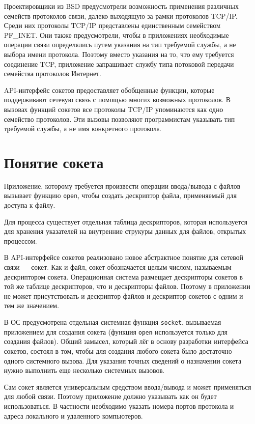 Проектировщики из BSD предусмотрели возможность применения различных семейств протоколов связи,  далеко выходящую за рамки протоколов TCP/IP. 
Среди них протоколы TCP/IP представлены единственным семейством PF\_INET. Они также предусмотрели,  
чтобы в приложениях необходимые операции связи определялись путем указания на тип требуемой службы,  
а не выбора имени протокола. Поэтому вместо указания на то,  что ему требуется соединение TCP,
приложение запрашивает службу типа потоковой передачи семейства протоколов Интернет.

API-интерфейс сокетов предоставляет обобщенные функции,  которые поддерживают сетевую связь с помощью многих возможных протоколов. В вызовах функций сокетов все протоколы TCP/IP упоминаются как одно семейство протоколов. Эти вызовы позволяют программистам указывать тип требуемой службы,  а не имя конкретного протокола.

\section{Понятие сокета}

Приложение,  которому требуется произвести операции ввода/вывода с файлов вызывает функцию {\tt open},  чтобы создать дескриптор файла,  применяемый для доступа к файлу. 

Для процесса существует отдельная таблица дескрипторов,  которая используется для хранения указателей на внутренние струкуры данных для файлов,  открытых процессом.

В API-интерфейсе сокетов реализовано новое абстрактное понятие для сетевой связи –-- сокет. Как и файл,  сокет обозначается целым числом,  называемым дескриптором сокета. Операционная система размещает дескрипторы сокетов в той же таблице дескрипторов,  что и дескрипторы файлов. Поэтому в приложении не может присутствовать и дескриптор файлов и дескриптор сокетов с одним и тем же значением.

В ОС предусмотрена отдельная системная функция {\tt socket},  вызываемая приложением для создания 
сокета (функция {\tt open} используется только для создания файлов). Общий замысел,  
который лёг в основу разработки интерфейса сокетов,  состоял в том,  чтобы для создания любого сокета
было достаточно одного системного вызова. Для указания точных сведений о назначении сокета
нужно выполнить еще несколько системных вызовов.

Сам сокет является универсальным средством ввода/вывода и может применяться для любой связи. Поэтому приложение должно указывать как он будет использоваться. В частности необходимо указать номера портов протокола и адреса локального и удаленного компьютеров. 

